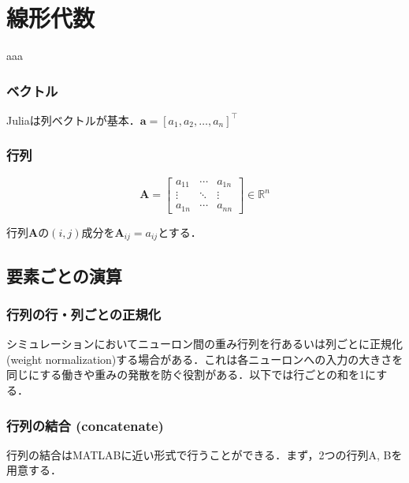 \section{線形代数}

aaa

\subsubsection{ベクトル}
Juliaは列ベクトルが基本．$\mathbf{a}=[a_1, a_2, \ldots, a_n]^\top$

\subsubsection{行列}


\begin{equation}
\mathbf{A} =\left[\begin{array}{ccc}
a_{11} & \cdots & a_{1n} \\
\vdots & \ddots & \vdots  \\
a_{1n} & \cdots & a_{nn}
\end{array}\right]
\in \mathbb{R}^n
\end{equation}


行列$\mathbf{A}$の$(i, j)$成分を$\mathbf{A}_{ij}=a_{ij}$とする．

\subsection{要素ごとの演算}
\subsubsection{行列の行・列ごとの正規化}
シミュレーションにおいてニューロン間の重み行列を行あるいは列ごとに正規化 (weight normalization)する場合がある．これは各ニューロンへの入力の大きさを同じにする働きや重みの発散を防ぐ役割がある．以下では行ごとの和を1にする．



\subsubsection{行列の結合 (concatenate)}
行列の結合はMATLABに近い形式で行うことができる．まず，2つの行列A, Bを用意する．


